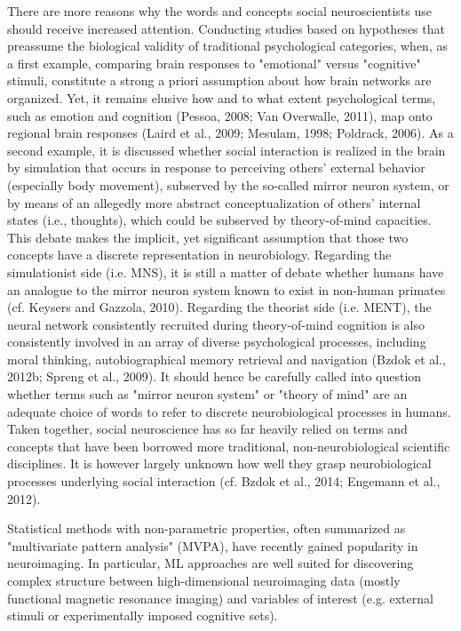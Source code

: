 \documentclass[authoryear,review,3p]{elsarticle}
\begin{document}
There are more reasons why the words and concepts social neuroscientists use should receive increased attention. Conducting studies based on hypotheses that preassume the biological validity of traditional psychological categories, when, as a first example, comparing brain responses to "emotional" versus "cognitive" stimuli, constitute a strong a priori assumption about how brain networks are organized. Yet, it remains elusive how and to what extent psychological terms, such as emotion and cognition (Pessoa, 2008; Van Overwalle, 2011), map onto regional brain responses (Laird et al., 2009; Mesulam, 1998; Poldrack, 2006). As a second example, it is discussed whether social interaction is realized in the brain by simulation that occurs in response to perceiving others' external behavior (especially body movement), subserved by the so-called mirror neuron system, or by means of an allegedly more abstract conceptualization of others' internal states (i.e., thoughts), which could be subserved by theory-of-mind capacities. This debate makes the implicit, yet significant assumption that those two concepts have a discrete representation in neurobiology. Regarding the simulationist side (i.e. MNS), it is still a matter of debate whether humans have an analogue to the mirror neuron system known to exist in non-human primates (cf. Keysers and Gazzola, 2010). Regarding the theorist side (i.e. MENT), the neural network consistently recruited during theory-of-mind cognition is also consistently involved in an array of diverse psychological processes, including moral thinking, autobiographical memory retrieval and navigation (Bzdok et al., 2012b; Spreng et al., 2009). It should hence be carefully called into question whether terms such as "mirror neuron system" or "theory of mind" are an adequate choice of words to refer to discrete neurobiological processes in humans. Taken together, social neuroscience has so far heavily relied on terms and concepts that have been borrowed more traditional, non-neurobiological scientific disciplines. It is however largely unknown how well they grasp neurobiological processes underlying social interaction (cf. Bzdok et al., 2014; Engemann et al., 2012).



Statistical methods with non-parametric properties, often summarized as "multivariate pattern analysis" (MVPA), have recently gained popularity in neuroimaging. In particular, ML approaches are well suited for discovering complex structure between high-dimensional neuroimaging data (mostly functional magnetic resonance imaging) and variables of interest (e.g. external stimuli or experimentally imposed cognitive sets). 
\end{document}
